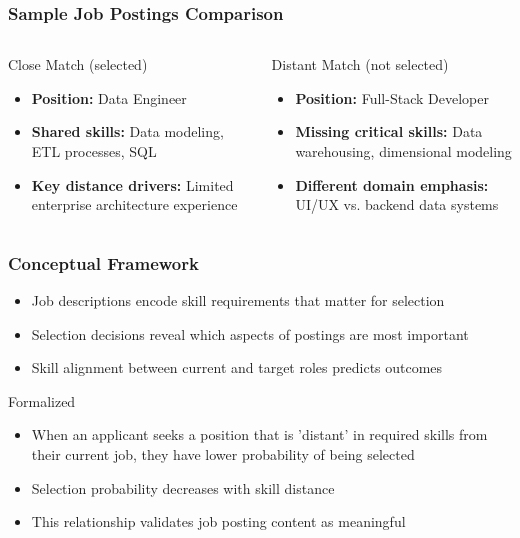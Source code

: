 \documentclass[11pt,xcolor={dvipsnames},hyperref={pdftex,pdfpagemode=UseNone,hidelinks,pdfdisplaydoctitle=true},usepdftitle=false]{beamer}
\begin{document}
\begin{frame}
\frametitle{Sample Job Postings Comparison}
\begin{center}
\end{center}

\vspace{0.5em}

\begin{columns}
\begin{column}{0.48\textwidth}
\begin{block}{Close Match (selected)}
\begin{itemize}
\item \textbf{Position:} Data Engineer
\item \textbf{Shared skills:} Data modeling, ETL processes, SQL
\item \textbf{Key distance drivers:} Limited enterprise architecture experience
\end{itemize}
\end{block}
\end{column}
\begin{column}{0.48\textwidth}
\begin{block}{Distant Match (not selected)}
\begin{itemize}
\item \textbf{Position:} Full-Stack Developer
\item \textbf{Missing critical skills:} Data warehousing, dimensional modeling
\item \textbf{Different domain emphasis:} UI/UX vs. backend data systems
\end{itemize}
\end{block}
\end{column}
\end{columns}
\end{frame}

\begin{frame}
\frametitle{Conceptual Framework}
\begin{itemize}
\item Job descriptions encode skill requirements that matter for selection
\item Selection decisions reveal which aspects of postings are most important
\item Skill alignment between current and target roles predicts outcomes
\end{itemize}

\begin{block}{Formalized}
\begin{itemize}
\item When an applicant seeks a position that is 'distant' in required skills from their current job, they have lower probability of being selected
\item Selection probability decreases with skill distance
\item This relationship validates job posting content as meaningful
\end{itemize}
\end{block}
\end{frame}
\end{document}
